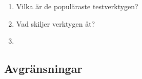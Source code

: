 \begin{enumerate}
\item Vilka är de populäraste testverktygen?
\item Vad skiljer verktygen åt?
\item 

\end{enumerate}

\subsection{Avgränsningar}




